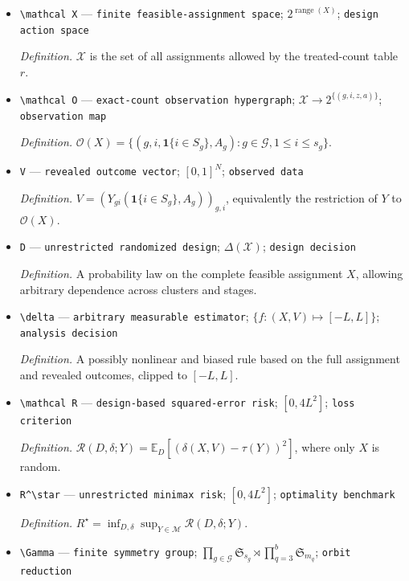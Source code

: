 \documentclass{article}
\begin{document}
\begin{itemize}
  \item \texttt{\textbackslash{}\allowbreak{}mathcal X} --- \texttt{finite feasible-\allowbreak{}assignment space}; \(2^{\operatorname{range}(X)}\); \texttt{design action space}
  \par\smallskip\noindent\emph{Definition.} \(\mathcal X\) is the set of all assignments allowed by the treated-count table \(r\).
  \item \texttt{\textbackslash{}\allowbreak{}mathcal O} --- \texttt{exact-\allowbreak{}count observation hypergraph}; \(\mathcal X\to2^{\{(g,i,z,a)\}}\); \texttt{observation map}
  \par\smallskip\noindent\emph{Definition.} \(\mathcal O(X)=\{(g,i,\mathbf 1\{i\in S_g\},A_g):g\in\mathcal G,1\le i\le s_g\}\).
  \item \texttt{V} --- \texttt{revealed outcome vector}; \([0,1]^N\); \texttt{observed data}
  \par\smallskip\noindent\emph{Definition.} \(V=(Y_{g i}(\mathbf 1\{i\in S_g\},A_g))_{g,i}\), equivalently the restriction of \(Y\) to \(\mathcal O(X)\).
  \item \texttt{D} --- \texttt{unrestricted randomized design}; \(\Delta(\mathcal X)\); \texttt{design decision}
  \par\smallskip\noindent\emph{Definition.} A probability law on the complete feasible assignment \(X\), allowing arbitrary dependence across clusters and stages.
  \item \texttt{\textbackslash{}\allowbreak{}delta} --- \texttt{arbitrary measurable estimator}; \(\{f:(X,V)\mapsto[-L,L]\}\); \texttt{analysis decision}
  \par\smallskip\noindent\emph{Definition.} A possibly nonlinear and biased rule based on the full assignment and revealed outcomes, clipped to \([-L,L]\).
  \item \texttt{\textbackslash{}\allowbreak{}mathcal R} --- \texttt{design-\allowbreak{}based squared-\allowbreak{}error risk}; \([0,4L^2]\); \texttt{loss criterion}
  \par\smallskip\noindent\emph{Definition.} \(\mathcal R(D,\delta;Y)=\mathbb E_D[(\delta(X,V)-\tau(Y))^2]\), where only \(X\) is random.
  \item \texttt{R\textasciicircum{}\textbackslash{}\allowbreak{}star} --- \texttt{unrestricted minimax risk}; \([0,4L^2]\); \texttt{optimality benchmark}
  \par\smallskip\noindent\emph{Definition.} \(R^\star=\inf_{D,\delta}\sup_{Y\in\mathcal M}\mathcal R(D,\delta;Y)\).
  \item \texttt{\textbackslash{}\allowbreak{}Gamma} --- \texttt{finite symmetry group}; \(\prod_{g\in\mathcal G}\mathfrak S_{s_g}\rtimes\prod_{q=3}^{b}\mathfrak S_{m_q}\); \texttt{orbit reduction}

\end{itemize}
\end{document}
